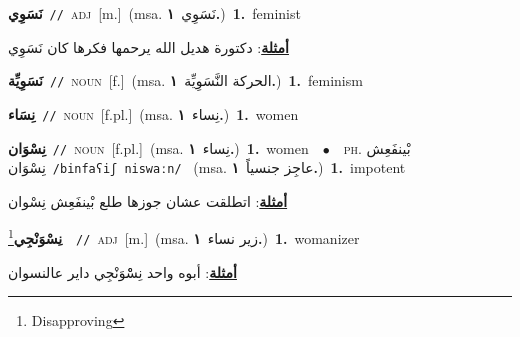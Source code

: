 \documentclass[10pt,a4paper,twoside]{article} %
\begin{document}
\begin{multicols}{2}
{\setlength\topsep{0pt}\textbf{\foreignlanguage{arabic}{نَسَوِي}}\ {\color{gray}\texttt{//}\color{black}}\ \textsc{adj}\ [m.]\ \color{gray}(msa. \foreignlanguage{arabic}{نَسَوِي}~\foreignlanguage{arabic}{\textbf{١.}})\color{black}\ \textbf{1.}~feminist\  \begin{flushright}\color{gray}\foreignlanguage{arabic}{\textbf{\underline{\foreignlanguage{arabic}{أمثلة}}}: دكتورة هديل الله يرحمها فكرها كان نَسَوِي}\end{flushright}\color{black}} \vspace{2mm}

{\setlength\topsep{0pt}\textbf{\foreignlanguage{arabic}{نَسَوِيِّة}}\ {\color{gray}\texttt{//}\color{black}}\ \textsc{noun}\ [f.]\ \color{gray}(msa. \foreignlanguage{arabic}{الحركة النَّسَوِيِّة}~\foreignlanguage{arabic}{\textbf{١.}})\color{black}\ \textbf{1.}~feminism\ } \vspace{2mm}

{\setlength\topsep{0pt}\textbf{\foreignlanguage{arabic}{نِسَاء}}\ {\color{gray}\texttt{//}\color{black}}\ \textsc{noun}\ [f.pl.]\ \color{gray}(msa. \foreignlanguage{arabic}{نِساء}~\foreignlanguage{arabic}{\textbf{١.}})\color{black}\ \textbf{1.}~women\ } \vspace{2mm}

{\setlength\topsep{0pt}\textbf{\foreignlanguage{arabic}{نِسْوَان}}\ {\color{gray}\texttt{//}\color{black}}\ \textsc{noun}\ [f.pl.]\ \color{gray}(msa. \foreignlanguage{arabic}{نِساء}~\foreignlanguage{arabic}{\textbf{١.}})\color{black}\ \textbf{1.}~women\ \ $\bullet$\ \ \textsc{ph.} \color{gray} \foreignlanguage{arabic}{بْينفَعِش نِسْوَان}\color{black}\ {\color{gray}\texttt{/{\sffamily binfaʕiʃ niswaːn}/}\color{black}}\ \color{gray} (msa. \foreignlanguage{arabic}{عاجِز جنسياً}~\foreignlanguage{arabic}{\textbf{١.}})\color{black}\ \textbf{1.}~impotent\  \begin{flushright}\color{gray}\foreignlanguage{arabic}{\textbf{\underline{\foreignlanguage{arabic}{أمثلة}}}: اتطلقت عشان جوزها طلع بْينفَعِش نِسْوان}\end{flushright}\color{black}} \vspace{2mm}

{\setlength\topsep{0pt}\textbf{\foreignlanguage{arabic}{نِسْوَنْجِي}}\footnote{Disapproving}\ \ {\color{gray}\texttt{//}\color{black}}\ \textsc{adj}\ [m.]\ \color{gray}(msa. \foreignlanguage{arabic}{زير نساء}~\foreignlanguage{arabic}{\textbf{١.}})\color{black}\ \textbf{1.}~womanizer\  \begin{flushright}\color{gray}\foreignlanguage{arabic}{\textbf{\underline{\foreignlanguage{arabic}{أمثلة}}}: أبوه واحد نِسْْوَنْجِي داير عالنسوان}\end{flushright}\color{black}} \vspace{2mm}


\end{multicols}
\end{document}

